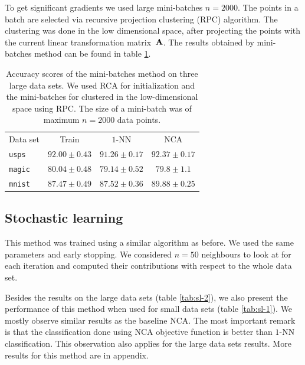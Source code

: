     To get significant gradients we used large mini-batches $n=2000$. The points in a batch are selected via recursive projection clustering (RPC) algorithm. The clustering was done in the low dimensional space, after projecting the points with the current linear transformation matrix~$\mathbf{A}$.
    The results obtained by mini-batches method can be found in table \ref{tab:mb}. 

    \begin{table}
        	\centering
        	\begin{tabular}{lccc}
        	\toprule
        	Data set & Train & $1$-NN & NCA \\
        	\cmidrule(r){2-2}\cmidrule(r){3-3}\cmidrule(r){4-4} 
        	 \texttt{usps}&$92.00 \pm 0.43$&$91.26 \pm 0.17$&$92.37 \pm 0.17$\\
        	 \texttt{magic}&$80.04 \pm 0.48$&$79.14 \pm 0.52$&$79.8 \pm 1.1$\\
        	 \texttt{mnist}&$87.47 \pm 0.49$&$87.52 \pm 0.36$&$89.88 \pm 0.25$\\
        	 \bottomrule
        	\end{tabular}
		\label{tab:mb}
		\caption{Accuracy scores of the mini-batches method on three large data sets. We used RCA for initialization and the mini-batches for clustered in the low-dimensional space using RPC. The size of a mini-batch was of maximum $n=2000$ data points.}
    \end{table}

    \subsection{Stochastic learning}
    \label{subsec:eval-stochastic-learning}

    This method was trained using a similar algorithm as before. We used the same parameters and early stopping. We considered $n=50$ neighbours to look at for each iteration and computed their contributions with respect to the whole data set. 

    Besides the results on the large data sets (table \ref{tab:sl-2}), we also present the performance of this method when used for small data sets (table \ref{tab:sl-1}). We mostly observe similar results as the baseline NCA. The most important remark is that the classification done using NCA objective function is better than $1$-NN classification. This observation also applies for the large data sets results. More results for this method are in appendix.

